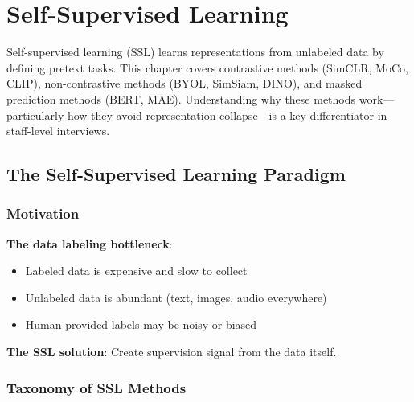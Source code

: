 \chapter{Self-Supervised Learning}
\label{chap:self_supervised}

\begin{tldr}
Self-supervised learning (SSL) learns representations from unlabeled data by defining pretext tasks. This chapter covers contrastive methods (SimCLR, MoCo, CLIP), non-contrastive methods (BYOL, SimSiam, DINO), and masked prediction methods (BERT, MAE). Understanding why these methods work—particularly how they avoid representation collapse—is a key differentiator in staff-level interviews.
\end{tldr}

\section{The Self-Supervised Learning Paradigm}
\label{sec:ssl_paradigm}

\subsection{Motivation}

\textbf{The data labeling bottleneck}:
\begin{itemize}
    \item Labeled data is expensive and slow to collect
    \item Unlabeled data is abundant (text, images, audio everywhere)
    \item Human-provided labels may be noisy or biased
\end{itemize}

\textbf{The SSL solution}: Create supervision signal from the data itself.

\subsection{Taxonomy of SSL Methods}

